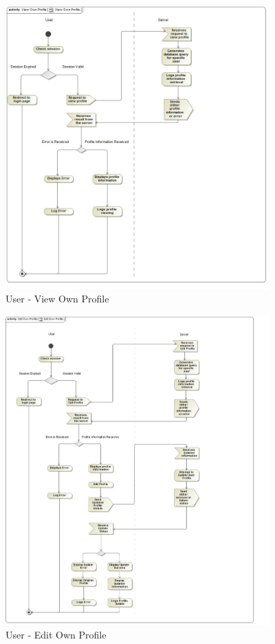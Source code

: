 \documentclass{article}
\begin{document}
			\begin{figure}[H]
				\includegraphics[width=4in, center]{../Diagrams/Process Specifications/View Own Profile.jpg}
				\caption{User - View Own Profile}
			\end{figure}
			\begin{figure}[H]
				\includegraphics[width=4in, center]{../Diagrams/Process Specifications/Edit Own Profile.jpg}
				\caption{User - Edit Own Profile}
			\end{figure}
\end{document}
